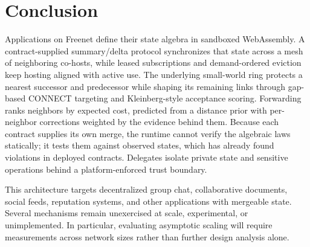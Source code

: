 \section{Conclusion}
\label{sec:conclusion}

Applications on Freenet define their state algebra in sandboxed WebAssembly. A contract-supplied summary/delta protocol synchronizes that state across a mesh of neighboring co-hosts, while leased subscriptions and demand-ordered eviction keep hosting aligned with active use. The underlying small-world ring protects a nearest successor and predecessor while shaping its remaining links through gap-based \textsf{CONNECT} targeting and Kleinberg-style acceptance scoring. Forwarding ranks neighbors by expected cost, predicted from a distance prior with per-neighbor corrections weighted by the evidence behind them. Because each contract supplies its own merge, the runtime cannot verify the algebraic laws statically; it tests them against observed states, which has already found violations in deployed contracts. Delegates isolate private state and sensitive operations behind a platform-enforced trust boundary.

This architecture targets decentralized group chat, collaborative documents, social feeds, reputation systems, and other applications with mergeable state. Several mechanisms remain unexercised at scale, experimental, or unimplemented. In particular, evaluating asymptotic scaling will require measurements across network sizes rather than further design analysis alone.
